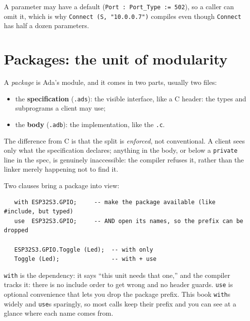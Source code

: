 A parameter may have a default (\texttt{Port : Port\_Type := 502}), so a caller can
omit it, which is why \texttt{Connect (S, "10.0.0.7")} compiles even though
\texttt{Connect} has half a dozen parameters.


\section{Packages: the unit of modularity}

A \emph{package} is Ada's module, and it comes in two parts, usually two files:

\begin{itemize}
  \item the \textbf{specification} (\texttt{.ads}): the visible interface, like a
        C header: the types and subprograms a client may use;
  \item the \textbf{body} (\texttt{.adb}): the implementation, like the \texttt{.c}.
\end{itemize}

The difference from C is that the split is \emph{enforced}, not conventional. A
client sees only what the specification declares; anything in the body, or below a
\texttt{private} line in the spec, is genuinely inaccessible: the compiler refuses
it, rather than the linker merely happening not to find it.

Two clauses bring a package into view:

\begin{lstlisting}
   with ESP32S3.GPIO;     -- make the package available (like #include, but typed)
   use  ESP32S3.GPIO;     -- AND open its names, so the prefix can be dropped

   ESP32S3.GPIO.Toggle (Led);  -- with only
   Toggle (Led);               -- with + use
\end{lstlisting}

\texttt{with} is the dependency: it says ``this unit needs that one,'' and the
compiler tracks it: there is no include order to get wrong and no header guards.
\texttt{use} is optional convenience that lets you drop the package prefix. This
book \texttt{with}s widely and \texttt{use}s sparingly, so most calls keep their
prefix and you can see at a glance where each name comes from.

